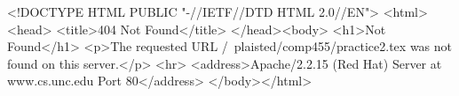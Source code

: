 <!DOCTYPE HTML PUBLIC "-//IETF//DTD HTML 2.0//EN">
<html><head>
<title>404 Not Found</title>
</head><body>
<h1>Not Found</h1>
<p>The requested URL /~plaisted/comp455/practice2.tex was not found on this server.</p>
<hr>
<address>Apache/2.2.15 (Red Hat) Server at www.cs.unc.edu Port 80</address>
</body></html>
